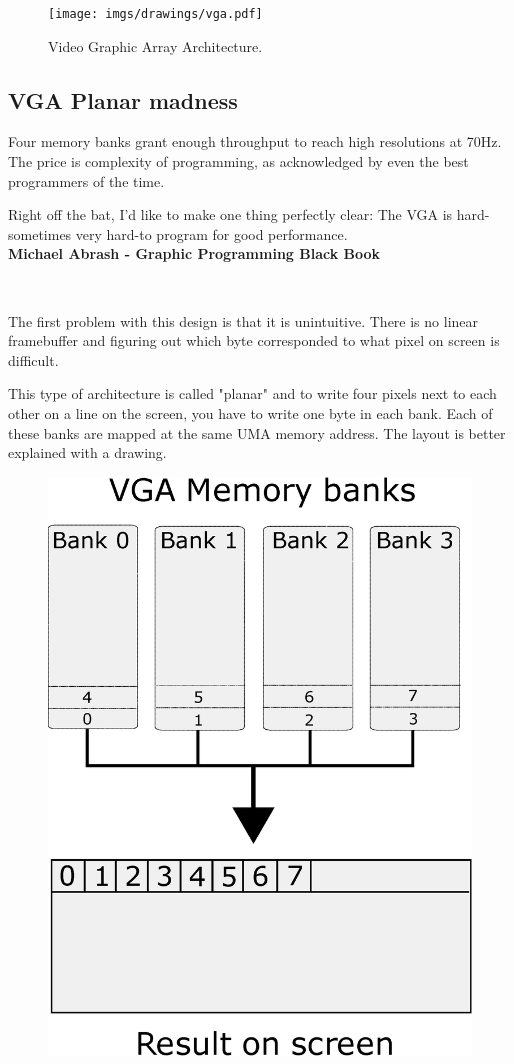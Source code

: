 \documentclass[book.tex]{subfiles}
\begin{document}
\begin{figure}[H]
\centering
\texttt{[image: imgs/drawings/vga.pdf]}
\caption{Video Graphic Array Architecture.}
\label{fig:vga_arch}
\end{figure}




\subsection{VGA Planar madness}

Four memory banks grant enough throughput to reach high resolutions at 70Hz. The price is complexity of programming, as acknowledged by even the best programmers of the time.\\

 \begin{fancyquotes}
   Right off the bat, I'd like to make one thing perfectly clear: The VGA is hard-sometimes very hard-to program for good performance.
 \bigskip \\
\textbf{Michael Abrash - Graphic Programming Black Book}
 \end{fancyquotes}
 \\
\par
The first problem with this design is that it is unintuitive. There is no linear framebuffer and figuring out which byte corresponded to what pixel on screen is difficult.\\
\par
 This type of architecture is called "planar" and to write four pixels next to each other on a line on the screen, you have to write one byte in each bank. Each of these banks are mapped at the same UMA memory address. The layout is better explained with a drawing.\\
\par
\begin{figure}[H]
\centering
\includegraphics[width=.6\textwidth]{imgs/drawings/vga_ram_screen_layout.eps}
\label{fig:vga_arch}
\end{figure}
\end{document}
